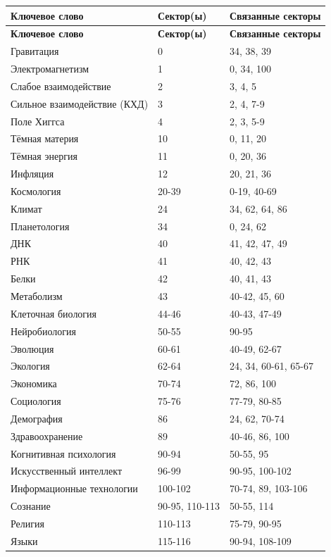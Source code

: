 \documentclass[11pt,a4paper]{article}
\begin{document}
	\begin{longtable}{|p{5cm}|p{3cm}|p{4cm}|}
		\hline
		\textbf{Ключевое слово} & \textbf{Сектор(ы)} & \textbf{Связанные секторы} \\
		\hline
		\endfirsthead
		\hline
		\textbf{Ключевое слово} & \textbf{Сектор(ы)} & \textbf{Связанные секторы} \\
		\hline
		\endhead
		Гравитация & 0 & 34, 38, 39 \\
		Электромагнетизм & 1 & 0, 34, 100 \\
		Слабое взаимодействие & 2 & 3, 4, 5 \\
		Сильное взаимодействие (КХД) & 3 & 2, 4, 7-9 \\
		Поле Хиггса & 4 & 2, 3, 5-9 \\
		Тёмная материя & 10 & 0, 11, 20 \\
		Тёмная энергия & 11 & 0, 20, 36 \\
		Инфляция & 12 & 20, 21, 36 \\
		Космология & 20-39 & 0-19, 40-69 \\
		Климат & 24 & 34, 62, 64, 86 \\
		Планетология & 34 & 0, 24, 62 \\
		ДНК & 40 & 41, 42, 47, 49 \\
		РНК & 41 & 40, 42, 43 \\
		Белки & 42 & 40, 41, 43 \\
		Метаболизм & 43 & 40-42, 45, 60 \\
		Клеточная биология & 44-46 & 40-43, 47-49 \\
		Нейробиология & 50-55 & 90-95 \\
		Эволюция & 60-61 & 40-49, 62-67 \\
		Экология & 62-64 & 24, 34, 60-61, 65-67 \\
		Экономика & 70-74 & 72, 86, 100 \\
		Социология & 75-76 & 77-79, 80-85 \\
		Демография & 86 & 24, 62, 70-74 \\
		Здравоохранение & 89 & 40-46, 86, 100 \\
		Когнитивная психология & 90-94 & 50-55, 95 \\
		Искусственный интеллект & 96-99 & 90-95, 100-102 \\
		Информационные технологии & 100-102 & 70-74, 89, 103-106 \\
		Сознание & 90-95, 110-113 & 50-55, 114 \\
		Религия & 110-113 & 75-79, 90-95 \\
		Языки & 115-116 & 90-94, 108-109 \\
	\end{longtable}
	
\end{document}
